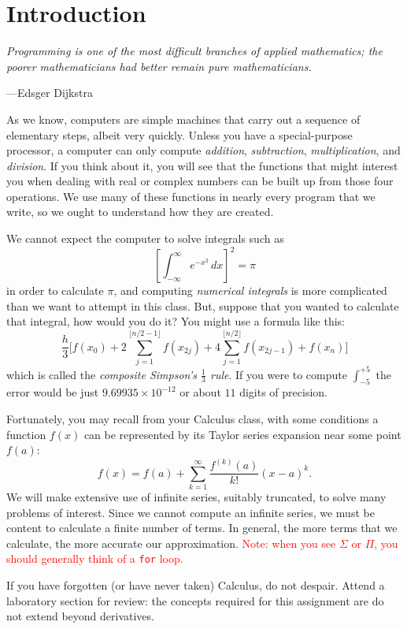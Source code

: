 \section{Introduction}

\textwidth \epigraph{\emph{Programming is one of the
most difficult branches of applied mathematics; the poorer
mathematicians had better remain pure mathematicians.}}{---Edsger
Dijkstra}

\noindent
As we know, computers are simple machines that carry out a sequence of
elementary steps, albeit very quickly. Unless you have a special-purpose
processor, a computer can only compute \emph{addition},
\emph{subtraction}, \emph{multiplication}, and \emph{division}. If you
think about it, you will see that the functions that might interest you
when dealing with real or complex numbers can be built up from those
four operations. We use many of these functions in nearly every program
that we write, so we ought to understand how they are created.

We cannot expect the computer to solve integrals such as
$$
\left [ \int_{-\infty}^\infty e^{-x^2} \, dx \right ] ^2
= \pi $$
in order to calculate $\pi$, and computing \emph{numerical
integrals} is more complicated than we want to attempt in this class.
But, suppose that
you wanted to calculate that integral, how would you do it? You might use a formula like this:
$$
\frac{h}{3}
   \bigg[f(x_0) + 2\sum_{j=1}^{\lfloor n/2-1 \rfloor} f(x_{2j}) + 4\sum_{j=1}^{\lfloor n/2 \rfloor} f(x_{2j-1}) + f(x_n)\bigg]
$$
which is called the \emph{composite Simpson's $\tfrac{1}{3}$ rule}.
If you were to compute $\int_{-5}^{+5}$ the error would be just $9.69935\times10^{-12}$ or about $11$ digits of precision.

Fortunately, you may recall from your Calculus class, with some
conditions a function $f(x)$ can be represented by its Taylor series
expansion near some point $f(a)$: $$ f(x) = f(a) + \sum_{k=1}^\infty
\frac{f^{(k)}(a)}{k!}{(x-a)}^k. $$ We will make extensive use of
infinite series, suitably truncated, to solve many problems of interest.
Since we cannot compute an infinite series, we must be content to
calculate a finite number of terms. In general, the more terms that we
calculate, the more accurate our approximation. \textcolor{red}{Note:
when you see $\Sigma$ or $\Pi$, you should generally think of a \texttt{for}
loop.}

If you have forgotten (or have never taken) Calculus, do not despair.
Attend a laboratory section for review: the concepts required for this
assignment are do not extend beyond derivatives.
